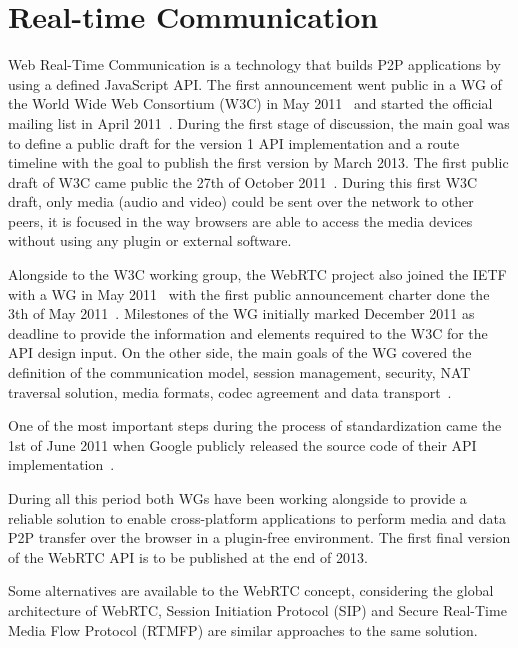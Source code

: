 \section{Real-time Communication}

\thispagestyle{empty}

Web Real-Time Communication is a technology that builds P2P applications by using a defined JavaScript API. The first announcement went public in a WG of the World Wide Web Consortium (W3C) in May 2011~\cite{webrtcW3cgroup} and started the official mailing list in April 2011~\cite{welcomeW3C}. During the first stage of discussion, the main goal was to define a public draft for the version 1 API implementation and a route timeline with the goal to publish the first version by March 2013. The first public draft of W3C came public the 27th of October 2011~\cite{originalW3Cdraft}. During this first W3C draft, only media (audio and video) could be sent over the network to other peers, it is focused in the way browsers are able to access the media devices without using any plugin or external software.

Alongside to the W3C working group, the WebRTC project also joined the IETF with a WG in May 2011~\cite{webrtcIETFgroup} with the first public announcement charter done the 3th of May 2011~\cite{webrtcIETFcharter}. Milestones of the WG initially marked December 2011 as deadline to provide the information and elements required to the W3C for the API design input. On the other side, the main goals of the WG covered the definition of the communication model, session management, security, NAT traversal solution, media formats, codec agreement and data transport~\cite{webrtcIETFcharter}.

One  of the most important steps during the process of standardization came the 1st of June 2011 when Google publicly released the source code of their API implementation~\cite{haraldpublicWebRTC}. 

During all this period both WGs have been working alongside to provide a reliable solution to enable cross-platform applications to perform media and data P2P transfer over the browser in a plugin-free environment. The first final version of the WebRTC API is to be published at the end of 2013.

Some alternatives are available to the WebRTC concept, considering the global architecture of WebRTC, Session Initiation Protocol (SIP) and Secure Real-Time Media Flow Protocol (RTMFP) are similar approaches to the same solution.

